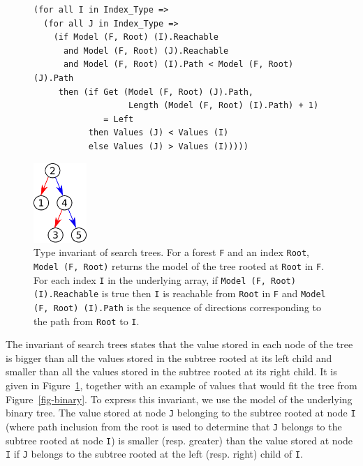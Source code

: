 \documentclass{llncs}
\begin{document}
\begin{figure}[ht]
\hspace{-3mm}
\begin{minipage}[c]{.79\linewidth}
\begin{small}
\begin{lstlisting}
(for all I in Index_Type =>
  (for all J in Index_Type =>
    (if Model (F, Root) (I).Reachable
      and Model (F, Root) (J).Reachable
      and Model (F, Root) (I).Path < Model (F, Root) (J).Path
     then (if Get (Model (F, Root) (J).Path,
                   Length (Model (F, Root) (I).Path) + 1)
              = Left
           then Values (J) < Values (I)
           else Values (J) > Values (I)))))
\end{lstlisting}
\end{small}
\end{minipage}
\begin{minipage}[c]{.22\linewidth}
\begin{center}
\includegraphics[width=2cm]{search.pdf}
\end{center}
\end{minipage}
\caption{\label{fig-search} Type invariant of search trees. For a forest \texttt{F}
and an index \texttt{Root}, \texttt{Model (F, Root)} returns the model of the tree
rooted at \texttt{Root} in \texttt{F}. For each index \texttt{I} in the underlying
array, if \texttt{Model (F, Root) (I).Reachable} is true then \texttt{I} is reachable from
\texttt{Root} in \texttt{F} and \texttt{Model (F, Root) (I).Path} is the sequence
of directions corresponding to the path from \texttt{Root} to \texttt{I}.}
\end{figure}

The invariant of search trees states that the value stored in each node of the
tree is bigger than all the values stored in the subtree rooted at its left
child and smaller than all the values stored in the subtree rooted at its right
child. It is given in Figure~\ref{fig-search}, together with an example of values that would
fit the tree from Figure~\ref{fig-binary}. To express this invariant, we use the model of the
underlying binary tree. The value stored at node \texttt{J} belonging to the subtree
rooted at node \texttt{I} (where path inclusion from the root is used to determine that
\texttt{J} belongs to the subtree rooted at node \texttt{I}) is smaller (resp. greater) than the
value stored at node \texttt{I} if \texttt{J} belongs to the subtree rooted at the left
(resp. right) child of \texttt{I}.
\end{document}
